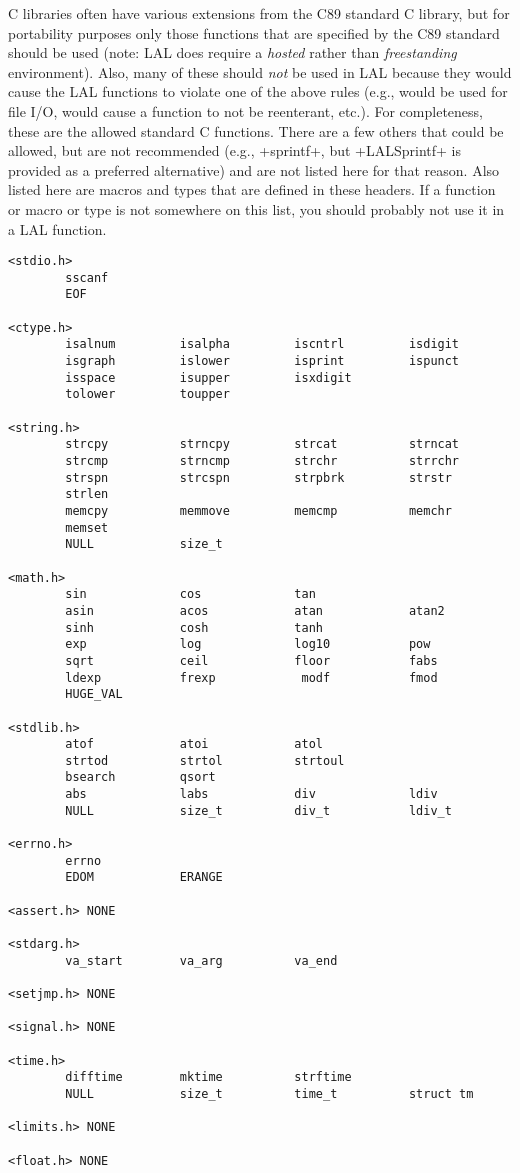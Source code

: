 \documentclass[10pt]{ligodcc}
\makeatletter
\def\verb{\relax\ifmmode\hbox\else\leavevmode\null\fi
  \bgroup
    \color{blue}\small
    \verb@eol@error \let\do\@makeother \dospecials
    \verbatim@font\@noligs
    \@ifstar\@sverb\@verb}
\makeatother
\begin{document}
C libraries often have various extensions from the C89 standard C library,
but for portability purposes only those functions that are specified by the
C89 standard should be used (note: LAL does require a \emph{hosted} rather
than \emph{freestanding} environment).  Also, many of these should \emph{not}
be used in LAL because they would cause the LAL functions to violate one of the
above rules (e.g., would be used for file I/O, would cause a function to not
be reenterant, etc.).  For completeness, these are the allowed standard C
functions.  There are a few others that could be allowed, but are not
recommended (e.g., \verb+sprintf+, but \verb+LALSprintf+ is provided as a
preferred alternative) and are not listed here for that reason.  Also listed
here are macros and types that are defined in these headers.  If a function
or macro or type is not somewhere on this list, you should probably not use
it in a LAL function.
\begin{verbatim}
<stdio.h>
        sscanf
        EOF

<ctype.h>
        isalnum         isalpha         iscntrl         isdigit
        isgraph         islower         isprint         ispunct
        isspace         isupper         isxdigit
        tolower         toupper

<string.h>
        strcpy          strncpy         strcat          strncat
        strcmp          strncmp         strchr          strrchr
        strspn          strcspn         strpbrk         strstr
        strlen
        memcpy          memmove         memcmp          memchr
        memset
        NULL            size_t

<math.h>
        sin             cos             tan
        asin            acos            atan            atan2
        sinh            cosh            tanh
        exp             log             log10           pow
        sqrt            ceil            floor           fabs
        ldexp           frexp            modf           fmod
        HUGE_VAL

<stdlib.h>
        atof            atoi            atol
        strtod          strtol          strtoul
        bsearch         qsort
        abs             labs            div             ldiv
        NULL            size_t          div_t           ldiv_t

<errno.h>
        errno
        EDOM            ERANGE

<assert.h> NONE

<stdarg.h>
        va_start        va_arg          va_end

<setjmp.h> NONE

<signal.h> NONE

<time.h>
        difftime        mktime          strftime
        NULL            size_t          time_t          struct tm

<limits.h> NONE

<float.h> NONE
\end{verbatim}
\end{document}
